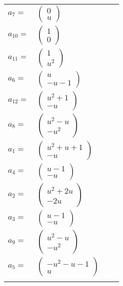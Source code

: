 \documentclass[1p]{elsarticle_modified}
\theoremstyle{definition}
\begin{document}
\begin{tabular}{m{7pt} m{180pt} m{7pt} m{180pt} }
\flushright $a_{7}=$&$\begin{pmatrix}0\\u\end{pmatrix}$ \\
\flushright $a_{10}=$&$\begin{pmatrix}1\\0\end{pmatrix}$ \\
\flushright $a_{11}=$&$\begin{pmatrix}1\\u^2\end{pmatrix}$ \\
\flushright $a_{6}=$&$\begin{pmatrix}u\\- u-1\end{pmatrix}$ \\
\flushright $a_{12}=$&$\begin{pmatrix}u^2+1\\- u\end{pmatrix}$ \\
\flushright $a_{8}=$&$\begin{pmatrix}u^2- u\\- u^2\end{pmatrix}$ \\
\flushright $a_{1}=$&$\begin{pmatrix}u^2+u+1\\- u\end{pmatrix}$ \\
\flushright $a_{4}=$&$\begin{pmatrix}u-1\\- u\end{pmatrix}$ \\
\flushright $a_{2}=$&$\begin{pmatrix}u^2+2 u\\-2 u\end{pmatrix}$ \\
\flushright $a_{3}=$&$\begin{pmatrix}u-1\\- u\end{pmatrix}$ \\
\flushright $a_{9}=$&$\begin{pmatrix}u^2- u\\- u^2\end{pmatrix}$ \\
\flushright $a_{5}=$&$\begin{pmatrix}- u^2- u-1\\u\end{pmatrix}$\\&\end{tabular}
\end{document}
